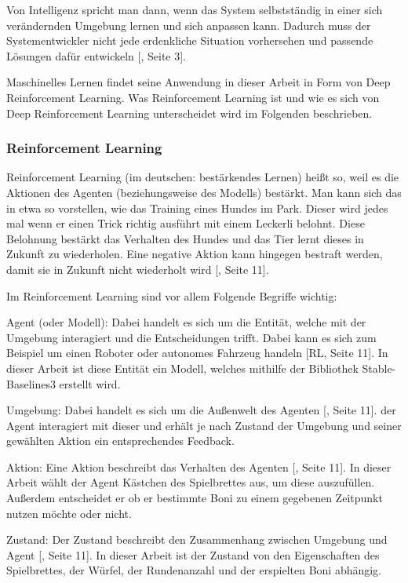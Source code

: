 Von Intelligenz spricht man dann, wenn das System selbstständig in einer sich verändernden Umgebung lernen und sich anpassen kann. Dadurch muss der Systementwickler nicht jede erdenkliche Situation vorhersehen und passende Lösungen dafür entwickeln [\cite{alpaydin_maschinelles_2022}, Seite 3].
 
Maschinelles Lernen findet seine Anwendung in dieser Arbeit in Form von Deep Reinforcement Learning. Was Reinforcement Learning ist und wie es sich von Deep Reinforcement Learning unterscheidet wird im Folgenden beschrieben.
\subsubsection{Reinforcement Learning}
Reinforcement Learning (im deutschen: bestärkendes Lernen) heißt so, weil es die Aktionen des Agenten (beziehungsweise des Modells) bestärkt. Man kann sich das in etwa so vorstellen, wie das Training eines Hundes im Park. Dieser wird jedes mal wenn er einen Trick richtig ausführt mit einem Leckerli belohnt. Diese Belohnung bestärkt das Verhalten des Hundes und das Tier lernt dieses in Zukunft zu wiederholen. Eine negative Aktion kann hingegen bestraft werden, damit sie in Zukunft nicht wiederholt wird [\cite{ris-ala_fundamentals_2023}, Seite 11].

Im Reinforcement Learning sind vor allem Folgende Begriffe wichtig:

Agent (oder Modell): Dabei handelt es sich um die Entität, welche mit der Umgebung interagiert und die Entscheidungen trifft. Dabei kann es sich zum Beispiel um einen Roboter oder autonomes Fahrzeug handeln [RL, Seite 11]. In dieser Arbeit ist diese Entität ein Modell, welches mithilfe der Bibliothek Stable-Baselines3 erstellt wird.

Umgebung: Dabei handelt es sich um die Außenwelt des Agenten [\cite{ris-ala_fundamentals_2023}, Seite 11]. der Agent interagiert mit dieser und erhält je nach Zustand der Umgebung und seiner gewählten Aktion ein entsprechendes Feedback.

Aktion: Eine Aktion beschreibt das Verhalten des Agenten [\cite{ris-ala_fundamentals_2023}, Seite 11]. In dieser Arbeit wählt der Agent Kästchen des Spielbrettes aus, um diese auszufüllen. Außerdem entscheidet er ob er bestimmte Boni zu einem gegebenen Zeitpunkt nutzen möchte oder nicht.

Zustand: Der Zustand beschreibt den Zusammenhang zwischen Umgebung und Agent [\cite{ris-ala_fundamentals_2023}, Seite 11]. In dieser Arbeit ist der Zustand von den Eigenschaften des Spielbrettes, der Würfel, der Rundenanzahl und der erspielten Boni abhängig.

